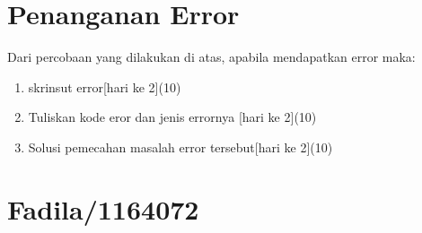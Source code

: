 \section{Penanganan Error}
Dari percobaan yang dilakukan di atas, apabila mendapatkan error maka:

\begin{enumerate}
	\item
	skrinsut error[hari ke 2](10)
	\item
Tuliskan kode eror dan jenis errornya [hari ke 2](10)
	\item
Solusi pemecahan masalah error tersebut[hari ke 2](10)

\end{enumerate}


\section{Fadila/1164072}
